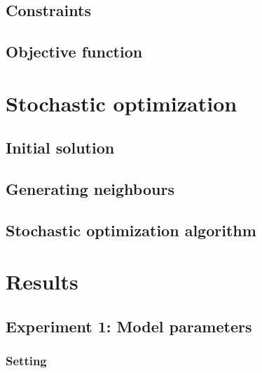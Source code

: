 \documentclass[11pt]{article}
\begin{document}
\subsection{Constraints}

\subsection{Objective function}


\section{Stochastic optimization}

\subsection{Initial solution}

\subsection{Generating neighbours}

\subsection{Stochastic optimization algorithm}


\section{Results}

\subsection{Experiment 1: Model parameters}

\subsubsection{Setting}
\end{document}
